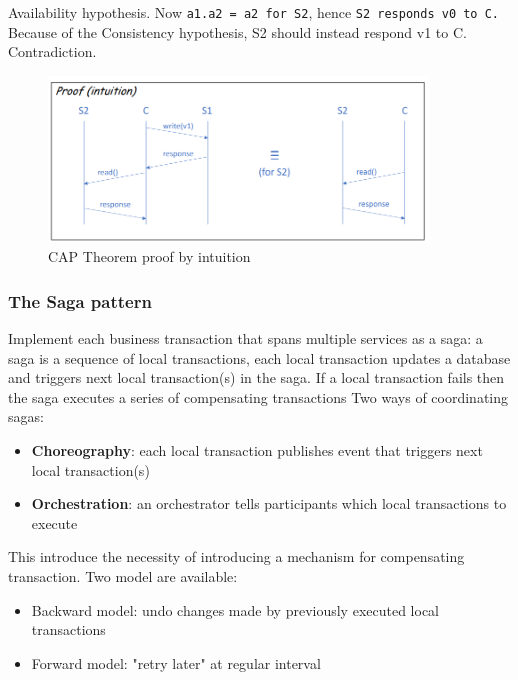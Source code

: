 \documentclass[10pt,a4paper]{report}
\begin{document}
Availability hypothesis.
Now \texttt{a1.a2 = a2 for S2}, hence \texttt{S2 responds v0 to C.}\\
Because of the Consistency hypothesis, S2 should instead respond v1 to C. Contradiction.
\begin{figure}[h]
	\centering
	\includegraphics[width=0.9\textwidth]{image62}
	\caption{CAP Theorem proof by intuition}
	\label{image62}
\end{figure} 


\subsubsection{The Saga pattern}
Implement each business transaction that spans multiple services as a saga: a saga is a sequence of local transactions, each local transaction updates a database and triggers next local transaction(s) in the saga.
If a local transaction fails then the saga executes a series of compensating transactions
Two ways of coordinating sagas:
\begin{itemize}
	\item \textbf{Choreography}: each local transaction publishes event that triggers next local transaction(s)
	\item \textbf{Orchestration}: an orchestrator tells participants which local transactions to execute
\end{itemize}
This introduce the necessity of introducing a mechanism for compensating transaction. Two model are available:
\begin{itemize}
	\item Backward model: undo changes made by previously executed local transactions
	\item Forward model: "retry later" at regular interval
\end{itemize}
\end{document}
